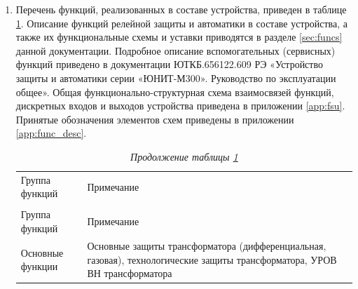 \begin{enumerate}[label=\arabic{section}.\arabic{subsection}.\arabic*, labelsep=4pt, leftmargin=0pt, itemindent=57pt]

\item
Перечень функций, реализованных в составе устройства, приведен в таблице \ref{desc:tbl1}. Описание функций релейной защиты и автоматики в составе устройства, а также их функциональные схемы и уставки приводятся в разделе \ref{sec:funcs} данной документации. Подробное описание вспомогательных (сервисных) функций приведено в документации ЮТКБ.656122.609 РЭ «Устройство защиты и автоматики серии «ЮНИТ-М300». Руководство по эксплуатации общее». Общая функционально-структурная схема взаимосвязей функций, дискретных входов и выходов устройства приведена в приложении \ref{app:fsu}. Принятые обозначения элементов схем приведены в приложении \ref{app:func_desc}.

\small
\setlength{\extrarowheight}{0.05cm} %
\begin{longtable}
{|>{\centering\arraybackslash}m{3.2cm}|>{\centering\arraybackslash}m{13.7cm}|}
\caption{Функции в составе устройства «ЮНИТ-М300-ДЗТ2»\hfill\vspace{-0.5\baselineskip}}\label{desc:tbl1}\\ 
\hhline{|-|-|}
\rowcolor{gray!30}
Группа функций & Примечание \\ 
\hhline{|-|-|}
\endfirsthead

\caption*{\hspace{3pt}\emph{Продолжение таблицы \ref{desc:tbl1}\hfill\vspace{-0.5\baselineskip}}} \\ %
\hhline{|-|-|}
\rowcolor{gray!30}
Группа функций & Примечание \\ 
\hhline{|-|-|}
\endhead
\hhline{|-|-|}

\endfoot
\endlastfoot

\centering Основные функции & \flushleft\arraybackslash Основные защиты трансформатора (дифференциальная, газовая), технологические защиты трансформатора, УРОВ ВН трансформатора  \\  \hline


\end{longtable}
\end{enumerate}

